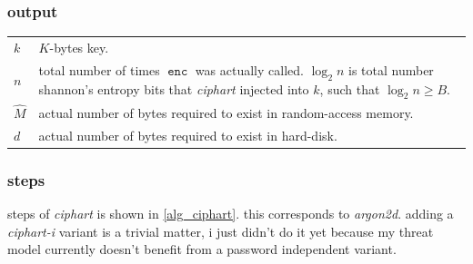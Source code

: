 \documentclass[twocolumn]{article}
\DeclareMathOperator{\enc}{\mathtt{enc}}
\begin{document}
\subsubsection{output}
\begin{tabularx}{\columnwidth}{lX}
$k$ & $K$-bytes key.\\
$n$ & total number of times $\enc$ was actually called.  $\log_2 n$ is
        total number shannon's entropy bits that \emph{ciphart} injected
        into $k$, such that $\log_2 n \ge B$.\\
$\hat M$ & actual number of bytes required to exist in random-access
            memory.\\
$d$     & actual number of bytes required to exist in hard-disk.\\
\end{tabularx}

\subsubsection{steps}
steps of \emph{ciphart} is shown in \cref{alg_ciphart}.  this corresponds
to \emph{argon2d}.  adding a \emph{ciphart-i} variant is a trivial matter,
i just didn't do it yet because my threat model currently doesn't benefit
from a password independent variant.
\end{document}
